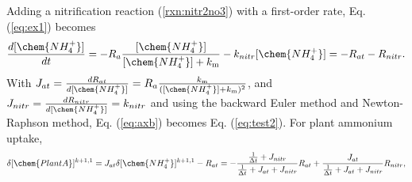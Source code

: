 \documentclass[gmd, manuscript]{copernicus}
\begin{document}
Adding a nitrification reaction (\ref{rxn:nitr2no3}) with a first-order rate,
Eq. (\ref{eq:ex1}) becomes
\begin{equation}
\frac{d[\chem{NH_4^+}]}{dt} =- R_a
\frac{[\chem{NH_4^+}]}{[\chem{NH_4^+}]+k_\text{m}}
- k_{nitr} [\chem{NH_4^+}] = -R_{at} - R_{nitr}.
\label{eq:ex2}
\end{equation}
%
%
%
With $J_{at} = \frac{dR_{at}}{d[\chem{NH_4^+}]} =
R_a\frac{k_\text{m}}{([\chem{NH_4^+}] + k_\text{m})^2}$, and $J_{nitr} =
\frac{dR_{nitr}}{d[\chem{NH_4^+}]}=k_{nitr}$ and using 
the backward Euler method and Newton-Raphson method, Eq. (\ref{eq:axb}) becomes Eq. (\ref{eq:test2}). For plant ammonium uptake, 
\begin{equation}
\delta [\chem{PlantA}]^{k+1,1} = J_{at} \delta [\chem{NH_4^+}]^{k+1,1} - R_{at}
= -\frac{\frac{1}{\Delta t} + J_{nitr}}{\frac{1}{\Delta t} + J_{at} + J_{nitr}}
R_{at} + \frac{J_{at} }{\frac{1}{\Delta t} + J_{at} + J_{nitr}} R_{nitr},
\end{equation}
\end{document}
